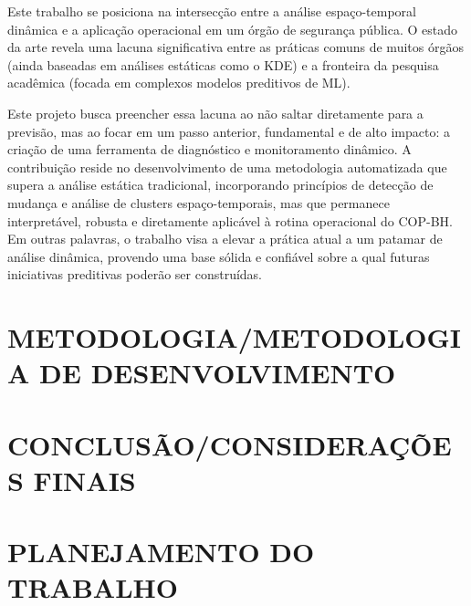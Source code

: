 Este trabalho se posiciona na intersecção entre a análise espaço-temporal dinâmica e a aplicação operacional em um órgão de segurança pública. O estado da arte revela uma lacuna significativa entre as práticas comuns de muitos órgãos (ainda baseadas em análises estáticas como o KDE) e a fronteira da pesquisa acadêmica (focada em complexos modelos preditivos de ML).

Este projeto busca preencher essa lacuna ao não saltar diretamente para a previsão, mas ao focar em um passo anterior, fundamental e de alto impacto: a criação de uma ferramenta de diagnóstico e monitoramento dinâmico. A contribuição reside no desenvolvimento de uma metodologia automatizada que supera a análise estática tradicional, incorporando princípios de detecção de mudança e análise de clusters espaço-temporais, mas que permanece interpretável, robusta e diretamente aplicável à rotina operacional do COP-BH. Em outras palavras, o trabalho visa a elevar a prática atual a um patamar de análise dinâmica, provendo uma base sólida e confiável sobre a qual futuras iniciativas preditivas poderão ser construídas.

\section{METODOLOGIA/METODOLOGIA DE DESENVOLVIMENTO} %
\label{sec:metodologia}

\section{CONCLUSÃO/CONSIDERAÇÕES FINAIS} %
\label{sec:conclusao}

\section{PLANEJAMENTO DO TRABALHO}
\label{sec:planejamento}


